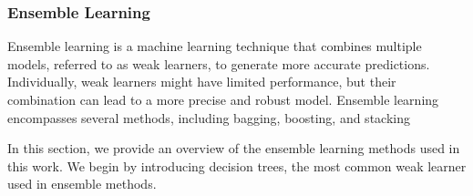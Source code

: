 \subsubsection{Ensemble Learning}
Ensemble learning is a machine learning technique that combines multiple models, referred to as weak learners, to generate more accurate predictions.
Individually, weak learners might have limited performance, but their combination can lead to a more precise and robust model.
Ensemble learning encompasses several methods, including bagging, boosting, and stacking\cite{James2023AnIS, pavlyshenko2018stacking}

In this section, we provide an overview of the ensemble learning methods used in this work.
We begin by introducing decision trees, the most common weak learner used in ensemble methods.
